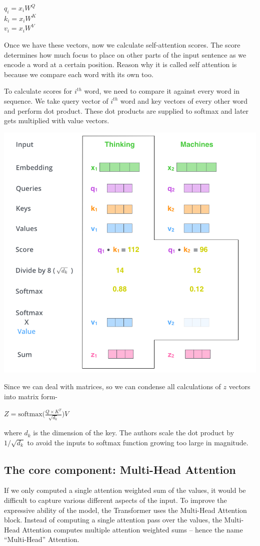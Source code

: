 \documentclass{article}
\begin{document}
\begin{multicols}{2}
\begin{center}
       $q_i = x_iW^Q$ \\
        $k_i = x_iW^K$\\
         $v_i = x_iW^V$
       
\end{center}
Once we have these vectors, now we calculate self-attention scores. The score determines how much focus to place on other parts of the input sentence as we encode a word at a certain position. Reason why it is called self attention is because we compare each word with its own too.

\noindent To calculate scores for $i^{th}$ word, we need to compare it against every word in sequence. We take query vector of $i^{th}$ word and key vectors of every other word and perform dot product. These dot products are supplied to softmax and later gets multiplied with value vectors.
\begin{center}
        \captionsetup{type=figure}
        \includegraphics[width=.40\textwidth]{ZvectorSoftmax.png}
\end{center}


\noindent Since we can deal with matrices, so we can condense all calculations of $z$ vectors into matrix form- 
\begin{center}
$Z = \text{softmax}\Big( \frac{Q\times K^T}{\sqrt{d_k}} \Big)V$\\
\end{center}
where $d_k$ is the dimension of the key. The authors scale the dot product by $1/\sqrt{d_k}$ to avoid the
inputs to softmax function growing too large in magnitude.
\subsection{The core component: Multi-Head Attention}

If we only computed a single attention weighted sum of the values, it would be difficult to capture various different aspects of the input. To improve the expressive ability of the model, the Transformer uses the Multi-Head Attention block. Instead of computing a single attention pass over the values, the Multi-Head Attention computes multiple attention weighted sums – hence the name “Multi-Head” Attention.


\end{multicols}
\end{document}
